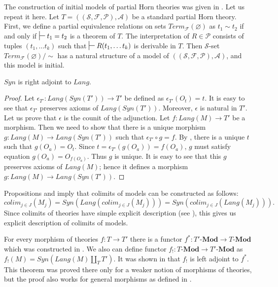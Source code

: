 \documentclass{mscs}
\newcommand{\cat}[1]{\mathbf{#1}}
\newcommand{\Mod}[1]{#1\text{-}\cat{Mod}}
\numberwithin{figure}{section}
\begin{document}
The construction of initial models of partial Horn theories was given in \cite{PHL}.
Let us repeat it here.
Let $T = ((\mathcal{S},\mathcal{F},\mathcal{P}),\mathcal{A})$ be a standard partial Horn theory.
First, we define a partial equivalence relations on sets $Term_\mathcal{F}(\varnothing)$ as $t_1 \sim t_2$ if and only if $\sststile{}{} t_1 = t_2$ is a theorem of $T$.
The interpretation of $R \in \mathcal{P}$ consists of tuples $(t_1, \ldots t_k)$ such that $\sststile{}{} R(t_1, \ldots t_k)$ is derivable in $T$.
Then $\mathcal{S}$-set $Term_\mathcal{F}(\varnothing)/\!\sim$ has a natural structure of a model of $((\mathcal{S},\mathcal{F},\mathcal{P}),\mathcal{A})$, and this model is initial.

\begin{prop}
$Syn$ is right adjoint to $Lang$.
\end{prop}
\begin{proof}
Let $\epsilon_{T'} : Lang(Syn(T')) \to T'$ be defined as $\epsilon_{T'}(O_t) = t$.
It is easy to see that $\epsilon_{T'}$ preserves axioms of $Lang(Syn(T'))$.
Moreover, $\epsilon$ is natural in $T'$.
Let us prove that $\epsilon$ is the counit of the adjunction.
Let $f : Lang(M) \to T'$ be a morphism.
Then we need to show that there is a unique morphism $g : Lang(M) \to Lang(Syn(T'))$ such that $\epsilon_{T'} \circ g = f$.
By , there is a unique $t$ such that $g(O_a) = O_t$.
Since $t = \epsilon_{T'}(g(O_a)) = f(O_a)$, $g$ must satisfy equation $g(O_a) = O_{f(O_a)}$.
Thus $g$ is unique.
It is easy to see that this $g$ preserves axioms of $Lang(M)$; hence it defines a morphism $g : Lang(M) \to Lang(Syn(T'))$.
\end{proof}

\begin{rem}[colimits]
Propositions  and  imply that colimits of models can be constructed as follows:
\[ colim_{j \in J}(M_j) = Syn(Lang(colim_{j \in J}(M_j))) = Syn(colim_{j \in J}(Lang(M_j))). \]
Since colimits of theories have simple explicit description (see \cite{alg-tt}), this gives us explicit description of colimits of models.
\end{rem}

For every morphism of theories $f : T \to T'$ there is a functor $f^* : \Mod{T'} \to \Mod{T}$ which was constructed in \cite{alg-tt}.
We also can define functor $f_! : \Mod{T} \to \Mod{T'}$ as $f_!(M) = Syn(Lang(M) \amalg_{T} T')$.
It was shown in \cite{PHL} that $f_!$ is left adjoint to $f^*$.
This theorem was proved there only for a weaker notion of morphisms of theories, but the proof also works for general morphisms as defined in \cite{alg-tt}.
\end{document}
